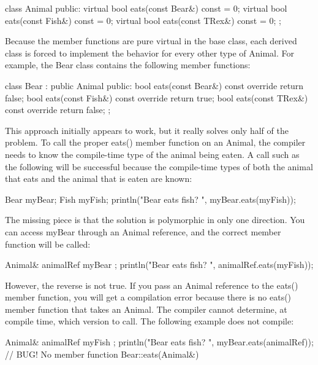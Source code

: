 \begin{cpp}
class Animal
{
    public:
        virtual bool eats(const Bear&) const = 0;
        virtual bool eats(const Fish&) const = 0;
        virtual bool eats(const TRex&) const = 0;
};
\end{cpp}

Because the member functions are pure virtual in the base class, each derived class is forced to implement the behavior for every other type of Animal. For example, the Bear class contains the following member functions:

\begin{cpp}
class Bear : public Animal
{
    public:
        bool eats(const Bear&) const override { return false; }
        bool eats(const Fish&) const override { return true; }
        bool eats(const TRex&) const override { return false; }
};
\end{cpp}

This approach initially appears to work, but it really solves only half of the problem. To call the proper eats() member function on an Animal, the compiler needs to know the compile-time type of the animal being eaten. A call such as the following will be successful because the compile-time types of both the animal that eats and the animal that is eaten are known:

\begin{cpp}
Bear myBear;
Fish myFish;
println("Bear eats fish? {}", myBear.eats(myFish));
\end{cpp}

The missing piece is that the solution is polymorphic in only one direction. You can access myBear through an Animal reference, and the correct member function will be called:

\begin{cpp}
Animal& animalRef { myBear };
println("Bear eats fish? {}", animalRef.eats(myFish));
\end{cpp}

However, the reverse is not true. If you pass an Animal reference to the eats() member function, you will get a compilation error because there is no eats() member function that takes an Animal. The compiler cannot determine, at compile time, which version to call. The following example does not compile:

\begin{cpp}
Animal& animalRef { myFish };
println("Bear eats fish? {}",
    myBear.eats(animalRef)); // BUG! No member function Bear::eats(Animal&)
\end{cpp}

